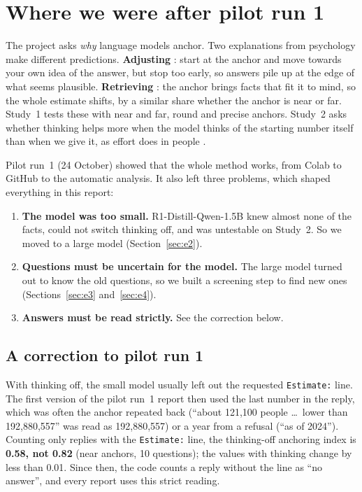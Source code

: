 \documentclass[11pt,a4paper]{article}
\begin{document}
\section{Where we were after pilot run 1}

The project asks \emph{why} language models anchor. Two explanations from psychology make different predictions. \textbf{Adjusting} \citep{tversky1974judgment,epley2006anchoring}: start at the anchor and move towards your own idea of the answer, but stop too early, so answers pile up at the edge of what seems plausible. \textbf{Retrieving} \citep{strack1997explaining,mussweiler1999hypothesis}: the anchor brings facts that fit it to mind, so the whole estimate shifts, by a similar share whether the anchor is near or far. Study~1 tests these with near and far, round and precise anchors. Study~2 asks whether thinking helps more when the model thinks of the starting number itself than when we give it, as effort does in people \citep{epley2001putting,epley2005effortful}.

Pilot run~1 (24 October) showed that the whole method works, from Colab to GitHub to the automatic analysis. It also left three problems, which shaped everything in this report:
\begin{enumerate}[leftmargin=*]
  \item \textbf{The model was too small.} R1-Distill-Qwen-1.5B knew almost none of the facts, could not switch thinking off, and was untestable on Study~2. So we moved to a large model (Section~\ref{sec:e2}).
  \item \textbf{Questions must be uncertain for the model.} The large model turned out to know the old questions, so we built a screening step to find new ones (Sections~\ref{sec:e3} and~\ref{sec:e4}).
  \item \textbf{Answers must be read strictly.} See the correction below.
\end{enumerate}

\subsection{A correction to pilot run 1}
\label{sec:correction}
With thinking off, the small model usually left out the requested \texttt{Estimate:} line. The first version of the pilot run~1 report then used the last number in the reply, which was often the anchor repeated back (\enquote{about 121,100 people \ldots\ lower than 192,880,557} was read as 192,880,557) or a year from a refusal (\enquote{as of 2024}). Counting only replies with the \texttt{Estimate:} line, the thinking-off anchoring index is \textbf{0.58, not 0.82} (near anchors, 10 questions); the values with thinking change by less than 0.01. Since then, the code counts a reply without the line as \enquote{no answer}, and every report uses this strict reading.
\end{document}
